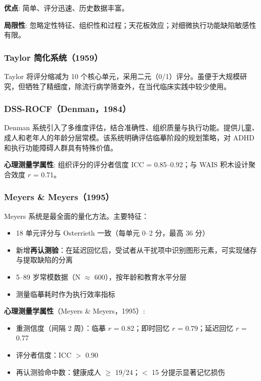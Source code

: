 \documentclass[12pt,a4paper]{ctexart}
\begin{document}
\textbf{优点}: 简单、评分迅速、历史数据丰富。

\textbf{局限性}: 忽略定性特征、组织性和过程；天花板效应；对细微执行功能缺陷敏感性有限。

\subsubsection{Taylor 简化系统（1959）}

Taylor 将评分缩减为 10 个核心单元，采用二元（0/1）评分。虽便于大规模研究，但牺牲了精细度，除流行病学筛查外，在当代临床实践中较少使用。

\subsubsection{DSS-ROCF（Denman，1984）}

Denman 系统引入了多维度评估，结合准确性、组织质量与执行功能。提供儿童、成人和老年人的年龄分层常模。该系统明确评估临摹阶段的规划策略，对 ADHD 和执行功能障碍人群具有特殊价值。

\textbf{心理测量学属性}: 组织评分的评分者信度 ICC = 0.85–0.92；与 WAIS 积木设计聚合效度 $r$ = 0.71。

\subsubsection{Meyers \& Meyers（1995）}

Meyers 系统是最全面的量化方法。主要特征：

\begin{itemize}
\item 18 单元评分与 Osterrieth 一致（每单元 0–2 分，最高 36 分）
\item 新增\textbf{再认测验}：在延迟回忆后，受试者从干扰项中识别图形元素，可实现储存与提取缺陷的分离
\item 5–89 岁常模数据（N $\approx$ 600），按年龄和教育水平分层
\item 测量临摹耗时作为执行效率指标
\end{itemize}

\textbf{心理测量学属性}（Meyers \& Meyers，1995）:

\begin{itemize}
\item 重测信度（间隔 2 周）：临摹 $r$ = 0.82；即时回忆 $r$ = 0.79；延迟回忆 $r$ = 0.77
\item 评分者信度：ICC $>$ 0.90
\item 再认测验命中数：健康成人 $\ge$ 19/24；$<$ 15 分提示显著记忆损伤
\end{itemize}
\end{document}
